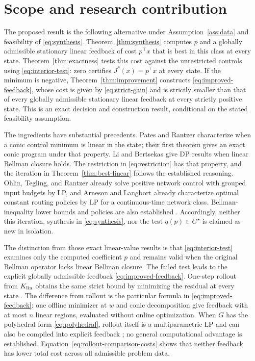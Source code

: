 \documentclass[10pt]{article}
\begin{document}
\section{Scope and research contribution}

The proposed result is the following alternative under Assumption~\ref{ass:data} and feasibility of \eqref{eq:synthesis}. Theorem~\ref{thm:synthesis} computes $p$ and a globally admissible stationary linear feedback of cost $p^\top x$ that is best in this class at every state. Theorem~\ref{thm:exactness} tests this cost against the unrestricted controls using \eqref{eq:interior-test}: zero certifies $J^*(x)=p^\top x$ at every state. If the minimum is negative, Theorem~\ref{thm:improvement} constructs \eqref{eq:improved-feedback}, whose cost is given by \eqref{eq:strict-gain} and is strictly smaller than that of every globally admissible stationary linear feedback at every strictly positive state. This is an exact decision and construction result, conditional on the stated feasibility assumption.

The ingredients have substantial precedents. Pates and Rantzer \cite[Theorem~2]{pates-rantzer} characterize when a conic control minimum is linear in the state; their first theorem gives an exact conic program under that property. Li and Bertsekas \cite{li-bertsekas} give DP results when linear Bellman closure holds. The restriction in \eqref{eq:restriction} has that property, and the iteration in Theorem~\ref{thm:best-linear} follows the established reasoning. Ohlin, Tegling, and Rantzer \cite{ohlin-tegling-rantzer} already solve positive network control with grouped input budgets by LP, and Arneson and Langbort \cite{arneson-langbort} already characterize optimal constant routing policies by LP for a continuous-time network class. Bellman-inequality lower bounds and policies are also established \cite{wang-odonoghue-boyd}. Accordingly, neither this iteration, synthesis in \eqref{eq:synthesis}, nor the test $q(p)\in G^\star$ is claimed as new in isolation.

The distinction from those exact linear-value results is that \eqref{eq:interior-test} examines only the computed coefficient $p$ and remains valid when the original Bellman operator lacks linear Bellman closure. The failed test leads to the explicit globally admissible feedback \eqref{eq:improved-feedback}. One-step rollout from $K_{\rm lin}$ obtains the same strict bound by minimizing the residual at every state \cite{li-johansson-martensson-bertsekas}. The difference from rollout is the particular formula in \eqref{eq:improved-feedback}: one offline minimizer at $w$ and conic decomposition give feedback with at most $n$ linear regions, evaluated without online optimization. When $G$ has the polyhedral form \eqref{eq:polyhedral}, rollout itself is a multiparametric LP and can also be compiled into explicit feedback \cite{bemporad-borrelli-morari}; no general computational advantage is established. Equation~\eqref{eq:rollout-comparison-costs} shows that neither feedback has lower total cost across all admissible problem data.
\end{document}

